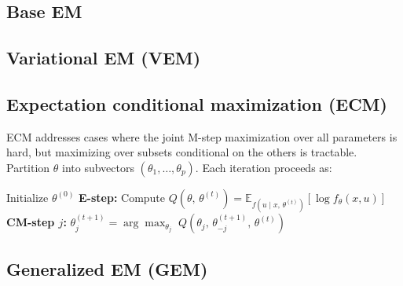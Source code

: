 \documentclass{article}
\begin{document}
\subsection{Base EM}
\subsection{Variational EM (VEM)}
\subsection{Expectation conditional maximization (ECM)}

ECM \citep{meng1993maximum} addresses cases where the joint M-step maximization
over all parameters is hard, but maximizing over subsets conditional on the
others is tractable. Partition $\theta$ into subvectors
$(\theta_1, \ldots, \theta_p)$. Each iteration proceeds as:

\begin{algorithm}[ht]
  \caption{Expectation Conditional Maximization (ECM) \citep{meng1993maximum}}
  \begin{algorithmic}[1]
    \State Initialize $\theta^{(0)}$
    \Repeat
    \State \textbf{E-step:} Compute
    $Q(\theta,\, \theta^{(t)}) =
      \mathbb{E}_{f(u \mid x,\, \theta^{(t)})}\!\left[\log f_\theta(x, u)\right]$
    \State \textbf{CM-step $j$:}
    $\theta_j^{(t+1)} = \arg\max_{\theta_j}\;
      Q\!\left(\theta_j,\, \theta_{-j}^{(t+1)},\, \theta^{(t)}\right)$
    \EndFor
  \end{algorithmic}
\end{algorithm}


\subsection{Generalized EM (GEM)}

\end{document}
